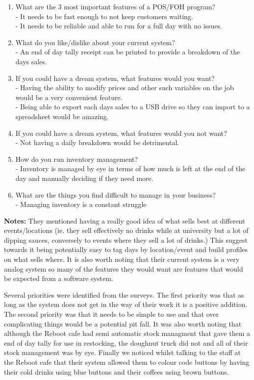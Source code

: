 \begin{enumerate}
	\item What are the 3 most important features of a POS/FOH program?\\
	 - It needs to be fast enough to not keep customers waiting.\\
	 - It needs to be reliable and able to run for a full day with no issues.
	\item What do you like/dislike about your current system?\\
	 - An end of day tally receipt can be printed to provide a breakdown of the days sales.
	\item If you could have a dream system, what features would you want?\\
	 - Having the ability to modify prices and other such variables on the job would be a very convenient feature.\\
	 - Being able to export each days sales to a USB drive so they can import to a spreadsheet would be amazing.
	\item If you could have a dream system, what features would you not want?\\
	 - Not having a daily breakdown would be detrimental.
	\item How do you run inventory management?\\
	 - Inventory is managed by eye in terms of how much is left at the end of the day and manually deciding if they need more.
	\item What are the things you find difficult to manage in your business?\\
	 - Managing inventory is a constant struggle
\end{enumerate}
\textbf{Notes:}
They mentioned having a really good idea of what sells best at different events/locations (ie. they sell effectively no drinks while at university but a lot of dipping sauces, conversely to events where they sell a lot of drinks.) This suggest towards it being potentially easy to tag days by location/event and build profiles on what sells where. It is also worth noting that their current system is a very analog system so many of the features they would want are features that would be expected from a software system.

Several priorities were identified from the surveys. The first priority was that as long as the system does not get in the way of their work it is a positive addition. The second priority was that it needs to be simple to use and that over complicating things would be a potential pit fall. It was also worth noting that although the Reboot cafe had semi automatic stock managment that gave them a end of day tally for use in restocking, the doughnut truck did not and all of their stock management was by eye. Finally we noticed whilst talking to the staff at the Reboot cafe that their system allowed them to colour code buttons by having their cold drinks using blue buttons and their coffees using brown buttons.
